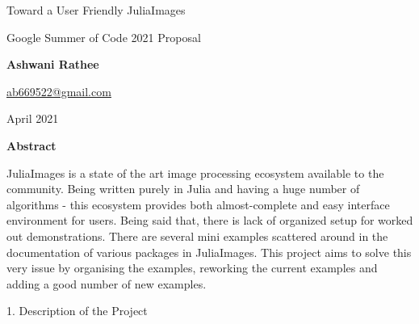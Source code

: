 \documentclass[10pt, twoside]{extarticle}
\begin{document}
\begin{center}
    \vspace*{20mm} 
    \Huge
    Toward a User Friendly JuliaImages
        
    \vspace{0.4cm}
    \large
    Google Summer of Code 2021 Proposal
        
    \vspace{1.0cm}
    \textbf{Ashwani Rathee}
    
    \vspace{0.2cm}
    \href{ashwani.198023@gmail.com}{ab669522@gmail.com}
    
    \vspace{1.0cm}
    April 2021
       
    \vspace{0.9cm}
    \textbf{Abstract}

    \vspace{0.2cm}
    \begin{changemargin}{1.5cm}{1.5cm} 
    \large
    \begin{flushleft}
     JuliaImages is a state of the art image processing
ecosystem available to the community. Being written purely in
Julia and having a huge number of algorithms - this ecosystem provides both almost-complete and easy interface environment for users.  Being said that,
there is lack of organized setup for worked out demonstrations. There are several mini examples scattered around in
the documentation of various packages in JuliaImages. This project
aims to solve this very issue by organising the examples, reworking
the current examples and adding a good number of new examples.
    \end{flushleft}   
    \end{changemargin}
\end{center}

\Huge
\textsf{1.  Description of the Project}\\
\end{document}

